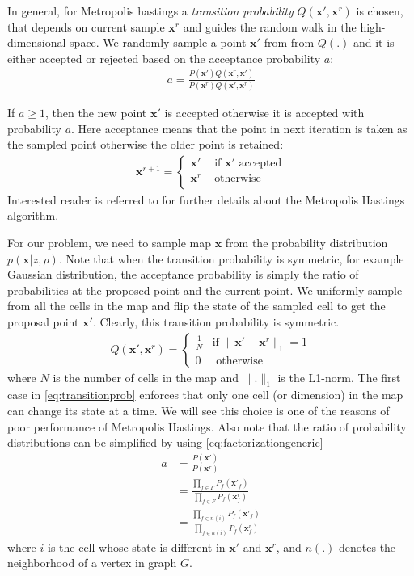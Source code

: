 \documentclass[letterpaper, 10 pt, conference]{ieeeconf} %
\newcommand{\vect}[1]{\mathbf{#1}}
\begin{document}
In general, for Metropolis hastings a \emph{transition probability} $Q(\vect{x}',
\vect{x}^r)$ is chosen, that depends on current sample $\vect{x}^r$ and guides
the random walk in the high-dimensional space. We randomly sample a point
$\vect{x}'$ from from $Q(.)$ and it is either accepted or rejected based on the
acceptance probability $a$:
\begin{align}
  a = \frac{P(\vect{x}')Q(\vect{x}^r, \vect{x}')}
  {P(\vect{x}^r)Q(\vect{x}', \vect{x}^r)}
\end{align}

If $a \ge 1$, then the new point $\vect{x}'$ is accepted otherwise it is accepted with probability $a$. Here acceptance means that the point in next iteration is taken as the sampled point otherwise the older point is retained:
\begin{align}
  \vect{x}^{r+1} = \begin{cases}
    \vect{x}' & \text{ if $\vect{x}'$ accepted}\\
    \vect{x}^r & \text{ otherwise}\\
  \end{cases}
\end{align}
Interested reader is referred to \cite{mackay1998introduction} for further details about the Metropolis Hastings algorithm.

For our problem, we need to sample map $\vect{x}$ from the probability
distribution $p(\vect{x}|z, \rho)$. Note that when the transition probability
is symmetric, for example Gaussian distribution, the acceptance probability is
simply the ratio of probabilities at the proposed point and the current point.
We uniformly sample from all the cells in the map and flip the state of the
sampled cell to get the proposal point $\vect{x}'$. Clearly, this transition probability is symmetric.
\begin{align}
  Q(\vect{x}', \vect{x}^r) = \begin{cases}
    \frac{1}{N} & \text{if $\|\vect{x}' - \vect{x}^r\|_1 = 1$}\\
      0 & \text{ otherwise}
  \end{cases}
  \label{eq:transitionprob}
\end{align}
where $N$ is the number of cells in the map and $\|.\|_1$ is the L1-norm. The
first case in \eqref{eq:transitionprob} enforces that only one cell (or dimension)
in the map
can change its state at a time. We will see this choice is one of the reasons of
poor performance of Metropolis Hastings. Also note that the ratio of probability distributions can be simplified by using \eqref{eq:factorizationgeneric}
\begin{align}
  a &= \frac{P(\vect{x}')}{P(\vect{x}^r)}\\
    &= \frac{\prod_{f \in F} P_f(\vect{x}'_f)}{\prod_{f \in F} P_f(\vect{x}^r_f)}\\
    &= \frac{\prod_{f \in n(i)} P_f(\vect{x}'_f)}{\prod_{f \in n(i)} P_f(\vect{x}^r_f)}
  \label{eq:acceptanceprob}
\end{align}
where $i$ is the cell whose state is different in $\vect{x}'$ and $\vect{x}^r$,
and $n(.)$ denotes the neighborhood of a vertex in graph $G$.
\end{document}
